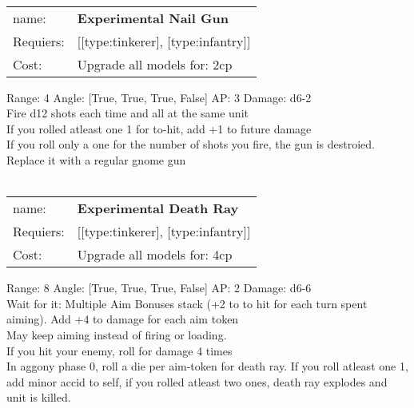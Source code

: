 \ \\
\begin{tabular}{ll}
name: & {\bf Experimental Nail Gun } \\
Requiers: & [[type:tinkerer], [type:infantry]] \\
Cost: & Upgrade all models for: 2cp \\
\end{tabular}



Range: 4  Angle: [True, True, True, False] AP: 3 Damage: d6-2 \\
Fire d12 shots each time and all at the same unit\\ 
If you rolled atleast one 1 for to-hit, add +1 to future damage\\ 
If you roll only a one for the number of shots you fire, the gun is destroied. Replace it with a regular gnome gun\\ 








\ \\
\begin{tabular}{ll}
name: & {\bf Experimental Death Ray } \\
Requiers: & [[type:tinkerer], [type:infantry]] \\
Cost: & Upgrade all models for: 4cp \\
\end{tabular}



Range: 8  Angle: [True, True, True, False] AP: 2 Damage: d6-6 \\
Wait for it: Multiple Aim Bonuses stack (+2 to to hit for each turn spent aiming). Add +4 to damage for each aim token\\ 
May keep aiming instead of firing or loading.\\ 
If you hit your enemy, roll for damage 4 times\\ 
In aggony phase 0, roll a die per aim-token for death ray. If you roll atleast one 1, add minor accid to self, if you rolled atleast two ones, death ray explodes and unit is killed.\\ 








